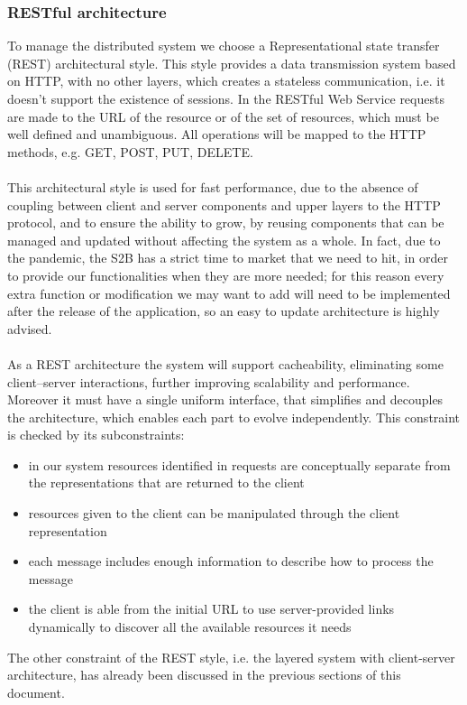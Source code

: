 \subsubsection{RESTful architecture}
To manage the distributed system we choose a Representational state transfer (REST) architectural style. This style provides a data transmission system based on HTTP, with no other layers, which creates a stateless communication, i.e. it doesn't support the existence of sessions. In the RESTful Web Service requests are made to the URL of the resource or of the set of resources, which must be well defined and unambiguous. All operations will be mapped to the HTTP methods, e.g. GET, POST, PUT, DELETE.\\\\ This architectural style is used for fast performance, due to the absence of coupling between client and server components and upper layers to the HTTP protocol, and to ensure the ability to grow, by reusing components that can be managed and updated without affecting the system as a whole. In fact, due to the pandemic, the S2B has a strict time to market that we need to hit, in order to provide our functionalities when they are more needed; for this reason every extra function or modification we may want to add will need to be implemented after the release of the application, so an easy to update architecture is highly advised.\\\\
As a REST architecture the system will support cacheability, eliminating some client–server interactions, further improving scalability and performance.\\
Moreover it must have a single uniform interface, that simplifies and decouples the architecture, which enables each part to evolve independently. This constraint is checked by its subconstraints:
\begin{itemize}
	\item in our system resources identified in requests are conceptually separate from the representations that are returned to the client
	\item resources given to the client can be manipulated through the client representation
	\item each message includes enough information to describe how to process the message
	\item the client is able from the initial URL to use server-provided links dynamically to discover all the available resources it needs
\end{itemize}
The other constraint of the REST style, i.e. the layered system with client-server architecture, has already been discussed in the previous sections of this document.
